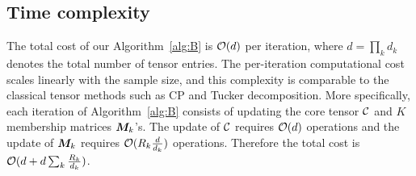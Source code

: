 \documentclass{article}
\begin{document}
\begin{appendices}



\section{Time complexity}
The total cost of our Algorithm~\ref{alg:B} is $\mathcal{O}(d)$ per iteration, where $d=\prod_k d_k$ denotes the total number of tensor entries. The per-iteration computational cost scales linearly with the sample size, and this complexity is comparable to the classical tensor methods such as CP and Tucker decomposition. More specifically, each iteration of Algorithm~\ref{alg:B} consists of updating the core tensor $\mathcal{C}$ and $K$ membership matrices $\bm M_k$'s. The update of $\mathcal{C}$ requires $\mathcal{O}(d)$ operations and the update of $\bm M_k$ requires $\mathcal{O}(R_k{d\over d_k})$ operations. Therefore the total cost is $\mathcal{O}(d+d\sum_k {R_k\over d_k})$. %



\end{appendices}
\end{document}

